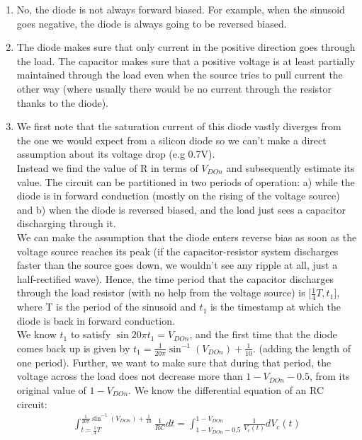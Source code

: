 \documentclass{article}
\begin{document}
\begin{prob}
	\begin{enumerate}
		\item No, the diode is not always forward biased. For example, when the sinusoid goes negative, the diode is always going to be reversed biased.

		\item The diode makes sure that only current in the positive direction goes through the load.
			The capacitor makes sure that a positive voltage is at least partially maintained through the load even when the source tries to pull current the other way (where usually there would be no current through the resistor thanks to the diode).

	\item We first note that the saturation current of this diode vastly diverges from the one we would expect from a silicon diode so we can't make a direct assumption about its voltage drop (e.g 0.7V). \\
		Instead we find the value of R in terms of $V_{DOn}$ and subsequently estimate its value.
		The circuit can be partitioned in two periods of operation: a) while the diode is in forward conduction (mostly on the rising of the voltage source) and b) when the diode is reversed biased, and the load just sees a capacitor discharging through it. \\
	We can make the assumption that the diode enters reverse bias as soon as the voltage source reaches its peak (if the capacitor-resistor system discharges faster than the source goes down, we wouldn't see any ripple at all, just a half-rectified wave).
		Hence, the time period that the capacitor discharges through the load resistor (with no help from the voltage source) is [$\frac{1}{4}T, t_1]$, where T is the period of the sinusoid and $t_1$ is the timestamp at which the diode is back in forward conduction. \\
		We know $t_1$ to satisfy  $\sin{20\pi t_1}=V_{DOn}$, and the first time that the diode comes back up is given by  $t_1=\frac{1}{20\pi}\sin ^{-1}(V_{DOn})+\frac{1}{10}$. (adding the length of one period).
		Further, we want to make sure that during that period, the voltage across the load does not decrease more than $1-V_{DOn}-0.5$, from its original value of $1-V_{DOn}$.
		We know the differential equation of an RC circuit:
		\begin{align*}
			\int _{t=\frac{1}{4}T}^{\frac{1}{20\pi}\sin ^{-1}(V_{DOn})+\frac{1}{10}}\frac{1}{RC}dt = \int _{1-V_{DOn}-0.5}^{1-V_{DOn}}\frac{1}{V_c(t)}dV_c(t) \\

\end{align*}
\end{enumerate}
\end{prob}
\end{document}
